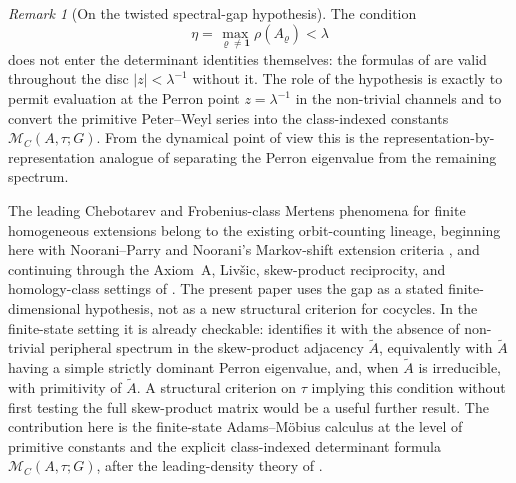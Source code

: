 \documentclass[11pt,a4paper]{amsart}
\theoremstyle{plain}
\theoremstyle{definition}
\theoremstyle{remark}
\newtheorem{remark}[theorem]{Remark}
\begin{document}
\begin{remark}[On the twisted spectral-gap hypothesis]
  \label{rem:twisted-spectral-gap-role}
  The condition
  \[
    \eta=\max_{\varrho\neq\mathbf 1}\rho(A_\varrho)<\lambda
  \]
  does not enter the determinant identities themselves: the formulas of
  are valid throughout the disc \(|z|<\lambda^{-1}\) without it. The
  role of the hypothesis is exactly to permit evaluation at the Perron
  point \(z=\lambda^{-1}\) in the non-trivial channels and to convert the
  primitive Peter--Weyl series into the class-indexed constants
  \(\mathcal M_C(A,\tau;G)\). From the dynamical point of view this is the
  representation-by-representation analogue of separating the Perron
  eigenvalue from the remaining spectrum.

  The leading Chebotarev and Frobenius-class Mertens phenomena for finite
  homogeneous extensions belong to the existing orbit-counting lineage,
  beginning here with Noorani--Parry
  \cite{NooraniParry1992ChebotarevShifts} and Noorani's Markov-shift
  extension criteria \cite{Noorani1997HomogeneousExtensionsMarkov}, and
  continuing through the Axiom~A, Liv\v{s}ic, skew-product reciprocity, and
  homology-class settings of
  \cite{ParryPollicott1986Chebotarev,Parry1999LivsicNonAbelian,ParryPollicott1997LivsicCompactLie,ParryPollicott2008BauerSkewProducts,PollicottSharp2008ArtinReciprocitySkewProducts,KatsudaSunada1990ClosedOrbitsHomology,Sharp1993ClosedOrbitsHomologyAnosov,PollicottSharp2007Chebotarev,BoyleSchmieding2017FiniteGroupExtensions}.
  The present paper uses the gap as a stated finite-dimensional hypothesis,
  not as a new structural criterion for cocycles.  In the finite-state setting
  it is already checkable:
   identifies it with the
  absence of non-trivial peripheral spectrum in the skew-product
  adjacency \(\widetilde A\), equivalently with \(\widetilde A\) having
  a simple strictly dominant Perron eigenvalue, and, when
  \(\widetilde A\) is irreducible, with primitivity of
  \(\widetilde A\). A structural criterion on \(\tau\) implying this condition
  without first testing the full skew-product matrix would be a useful further
  result.  The contribution here is the finite-state Adams--M\"obius calculus at
  the level of primitive constants and the explicit class-indexed determinant
  formula \(\mathcal M_C(A,\tau;G)\), after the leading-density theory of
  \cite{Lalley1987DistributionPeriodicOrbits,Coles2025VassilievWritheAxiomA}.
\end{remark}
\end{document}
